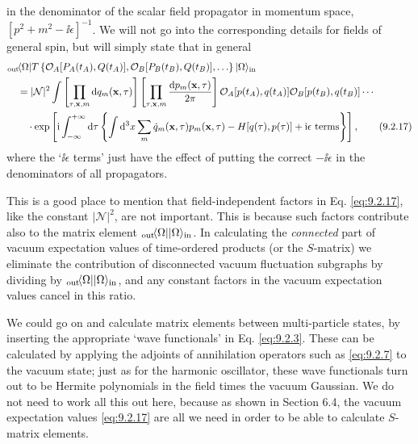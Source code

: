 in the denominator of the scalar field propagator in momentum space,
$[p^2+m^2-\ii\epsilon]^{-1}$. We will not go into the corresponding details
for fields of general spin, but will simply state that in general
\begin{align}
  &{}_{\mathrm{out}}\!\langle \Omega\rvert T\left\{
  \mathcal{O}_A[P_A(t_A),Q(t_A)],
  \mathcal{O}_B[P_B(t_B),Q(t_B)],\ldots\right\}\lvert \Omega\rangle_{\mathrm{in}}
  \notag\\
  &\quad={}|\mathcal{N}|^2\int
  \left[\prod_{\tau,\mathbf{x},m}\mathop{}\!\mathrm{d} q_m(\mathbf{x},\tau)\right]
  \left[\prod_{\tau,\mathbf{x},m}\frac{\mathop{}\!\mathrm{d} p_m(\mathbf{x},\tau)}{2\pi}\right]
  \mathcal{O}_A[p(t_A),q(t_A)]\mathcal{O}_B[p(t_B),q(t_B)]\cdots
  \notag\\
  &\qquad\cdot\exp\left[\mathrm{i}\int_{-\infty}^{+\infty}\mathop{}\!\mathrm{d}\tau
  \left\{\int \mathop{}\!\mathrm{d}^3x\sum_m\dot q_m(\mathbf{x},\tau)p_m(\mathbf{x},\tau)
  -H[q(\tau),p(\tau)]+\mathrm{i}\epsilon\text{ terms}\right\}\right],
  \tag{9.2.17}\label{eq:9.2.17}
\end{align}
where the `$\ii\epsilon$ terms' just have the effect of putting the correct
$-\ii\epsilon$ in the denominators of all propagators.

This is a good place to mention that field-independent factors in Eq. \eqref{eq:9.2.17},
like the constant $|\mathcal{N}|^2$, are not important. This is because such
factors contribute also to the matrix element
${}_{\mathrm{out}}\!\langle \Omega\rvert\lvert \Omega\rangle_{\mathrm{in}}$. In calculating the
\emph{connected} part of vacuum expectation values of time-ordered products
(or the $S$-matrix) we eliminate the contribution of disconnected vacuum
fluctuation subgraphs by dividing by
${}_{\mathrm{out}}\!\langle \Omega\rvert\lvert \Omega\rangle_{\mathrm{in}}$, and any constant
factors in the vacuum expectation values cancel in this ratio.

We could go on and calculate matrix elements between multi-particle states,
by inserting the appropriate `wave functionals' in Eq. \eqref{eq:9.2.3}. These can be
calculated by applying the adjoints of annihilation operators such as \eqref{eq:9.2.7}
to the vacuum state; just as for the harmonic oscillator, these wave
functionals turn out to be Hermite polynomials in the field times the vacuum
Gaussian. We do not need to work all this out here, because as shown in
Section 6.4, the vacuum expectation values \eqref{eq:9.2.17} are all we need in order
to be able to calculate $S$-matrix elements.
